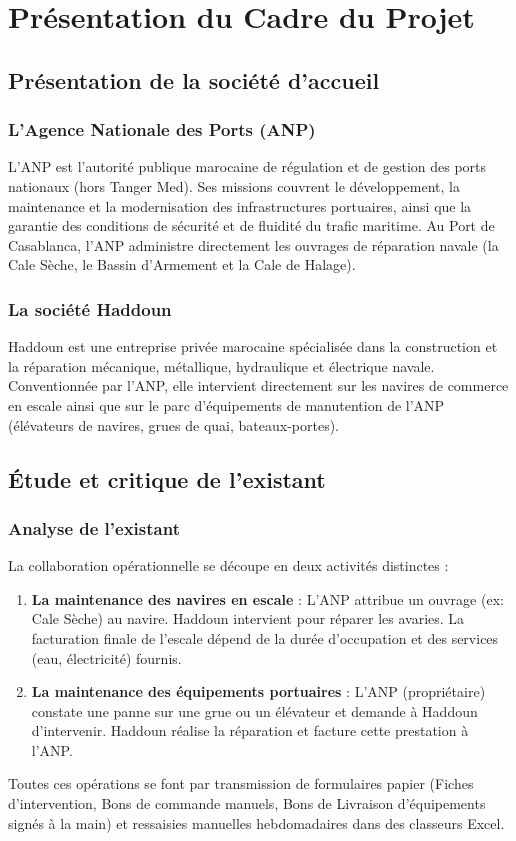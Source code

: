 \documentclass[12pt,a4paper,oneside]{report}
\begin{document}
\chapter{Présentation du Cadre du Projet}

\section{Présentation de la société d'accueil}
\subsection{L'Agence Nationale des Ports (ANP)}
L'ANP est l'autorité publique marocaine de régulation et de gestion des ports nationaux (hors Tanger Med). Ses missions couvrent le développement, la maintenance et la modernisation des infrastructures portuaires, ainsi que la garantie des conditions de sécurité et de fluidité du trafic maritime. Au Port de Casablanca, l'ANP administre directement les ouvrages de réparation navale (la Cale Sèche, le Bassin d'Armement et la Cale de Halage).

\subsection{La société Haddoun}
Haddoun est une entreprise privée marocaine spécialisée dans la construction et la réparation mécanique, métallique, hydraulique et électrique navale. Conventionnée par l'ANP, elle intervient directement sur les navires de commerce en escale ainsi que sur le parc d'équipements de manutention de l'ANP (élévateurs de navires, grues de quai, bateaux-portes).

\section{Étude et critique de l'existant}
\subsection{Analyse de l'existant}
La collaboration opérationnelle se découpe en deux activités distinctes :
\begin{enumerate}
    \item \textbf{La maintenance des navires en escale} : L'ANP attribue un ouvrage (ex: Cale Sèche) au navire. Haddoun intervient pour réparer les avaries. La facturation finale de l'escale dépend de la durée d'occupation et des services (eau, électricité) fournis.
    \item \textbf{La maintenance des équipements portuaires} : L'ANP (propriétaire) constate une panne sur une grue ou un élévateur et demande à Haddoun d'intervenir. Haddoun réalise la réparation et facture cette prestation à l'ANP.
\end{enumerate}
Toutes ces opérations se font par transmission de formulaires papier (Fiches d'intervention, Bons de commande manuels, Bons de Livraison d'équipements signés à la main) et ressaisies manuelles hebdomadaires dans des classeurs Excel.
\end{document}
